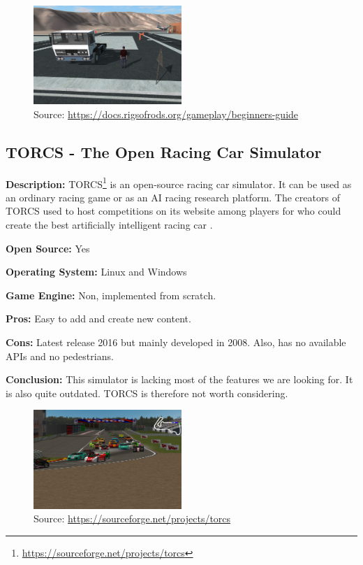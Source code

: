 \begin{figure}[H]
    \centering
    \includegraphics[width=0.5\textwidth]{Simulators/RoR.png}
    \caption{Source: \url{https://docs.rigsofrods.org/gameplay/beginners-guide}}
\end{figure}


\subsection{TORCS - The Open Racing Car Simulator}
\textbf{Description:} TORCS\footnote{\url{https://sourceforge.net/projects/torcs}} is an open-source racing car simulator. It can be used as an ordinary racing game or as an AI racing research platform. The creators of TORCS used to host competitions on its website among players for who could create the best artificially intelligent racing car \cite{TORCS_Racing}. 

\textbf{Open Source:} Yes

\textbf{Operating System:} Linux and Windows

\textbf{Game Engine:} Non, implemented from scratch.

\textbf{Pros:} Easy to add and create new content. 

\textbf{Cons:} Latest release 2016 but mainly developed in 2008. Also, has no available APIs and no pedestrians.

\textbf{Conclusion:} This simulator is lacking most of the features we are looking for. It is also quite outdated. TORCS is therefore not worth considering. 

\begin{figure}[H]
    \centering
    \includegraphics[width=0.5\textwidth]{Simulators/TORCS.png}
    \caption{Source: \url{https://sourceforge.net/projects/torcs}}
\end{figure}

